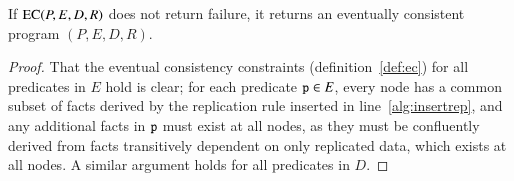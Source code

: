 \begin{theorem}
If $\textsc{EC}(P, E, D, R)$ does not return failure, it returns an eventually consistent program $(P, E, D, R)$.
\end{theorem}
\begin{proof}
That the eventual consistency constraints (definition~\ref{def:ec}) for all predicates in $E$ hold is clear; for each predicate $\dedalus{p} \in E$, every node has a common subset of facts derived by the replication rule inserted in line~\ref{alg:insertrep}, and any additional facts in $\dedalus{p}$ must exist at all nodes, as they must be confluently derived from facts transitively dependent on only replicated data, which exists at all nodes.  A similar argument holds for all predicates in $D$.
\end{proof}

